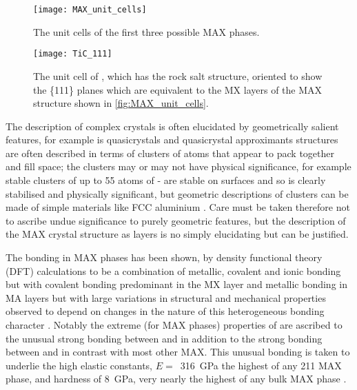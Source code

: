 \begin{figure}
\centering
\texttt{[image: MAX\_unit\_cells]}
\caption{The unit cells of the first three possible MAX phases.\label{fig:MAX_unit_cells}}
\end{figure}




\begin{figure}
\centering
{}
\texttt{[image: TiC\_111]}
\caption[The unit cell of .]{The unit cell of , which has the rock salt structure, oriented to show the \{111\} planes which are equivalent to the MX layers of the MAX structure shown in \autoref{fig:MAX_unit_cells}. \label{fig:TiC_111}}
\end{figure}


The description of complex crystals is often elucidated by geometrically salient features, for example is quasicrystals and quasicrystal approximants structures are often described in terms of clusters of atoms that appear to pack together and fill space; the clusters may or may not have physical significance, for example stable clusters of up to 55 atoms of - are stable on surfaces and so is clearly stabilised and physically significant, but geometric descriptions of clusters can be made of simple materials like FCC aluminium \cite{Steurer2006}. Care must be taken therefore not to ascribe undue significance to purely geometric features, but the description of the MAX crystal structure as layers is no simply elucidating but can be justified.

The bonding in MAX phases has been shown, by density functional theory (DFT) calculations to be a combination of metallic, covalent and ionic bonding but with covalent bonding predominant in the MX layer and metallic bonding in MA layers but with large variations in structural and mechanical properties observed to depend on changes in the nature of this heterogeneous bonding character \cite{Radovic2013,Sun2011}. Notably the extreme (for MAX phases) properties of  are ascribed to the unusual strong bonding between  and  in addition to the strong bonding between  and  in contrast with most other MAX. This unusual bonding is taken to underlie the high elastic constants, $E =$~\SI{316}{\giga\pascal} the highest of any 211 MAX phase, and hardness of \SI{8}{\giga\pascal}, very nearly the highest of any bulk MAX phase \cite{Feng2010,Sun2011}.


